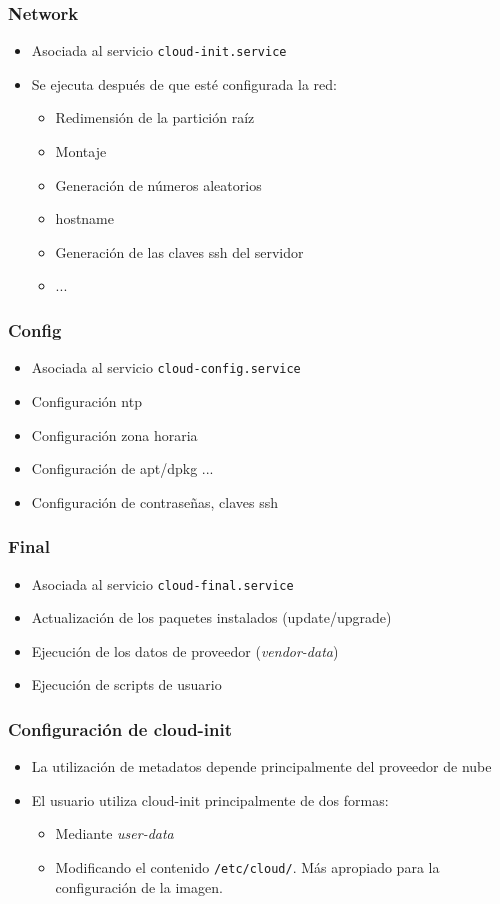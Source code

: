 \documentclass[aspectratio=169]{beamer}
\begin{document}
\begin{frame}
  \frametitle{Network}
  \begin{itemize}
  \item Asociada al servicio \texttt{cloud-init.service}
  \item Se ejecuta después de que esté configurada la red:
    \begin{itemize}
    \item Redimensión de la partición raíz
    \item Montaje
    \item Generación de números aleatorios
    \item hostname
    \item Generación de las claves ssh del servidor
    \item ...
    \end{itemize}
  \end{itemize}
\end{frame}

\begin{frame}
  \frametitle{Config}
  \begin{itemize}
  \item Asociada al servicio \texttt{cloud-config.service}
  \item Configuración ntp
  \item Configuración zona horaria
  \item Configuración de apt/dpkg ...
  \item Configuración de contraseñas, claves ssh
  \end{itemize}
\end{frame}

\begin{frame}
  \frametitle{Final}
  \begin{itemize}
  \item Asociada al servicio \texttt{cloud-final.service}
  \item Actualización de los paquetes instalados (update/upgrade)
  \item Ejecución de los datos de proveedor (\textit{vendor-data})
  \item Ejecución de scripts de usuario
  \end{itemize}
\end{frame}

\begin{frame}
  \frametitle{Configuración de cloud-init}
  \begin{itemize}
  \item La utilización de metadatos depende principalmente del proveedor de nube
  \item El usuario utiliza cloud-init principalmente de dos formas:
    \begin{itemize}
    \item Mediante \textit{user-data}
    \item Modificando el contenido \texttt{/etc/cloud/}. Más apropiado
      para la configuración de la imagen.
    \end{itemize}
  \end{itemize}
\end{frame}
\end{document}
